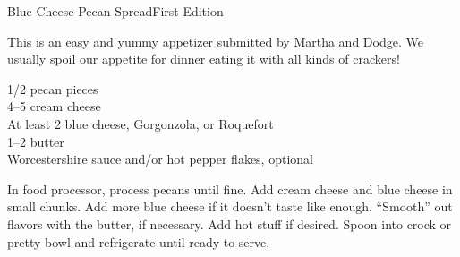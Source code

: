 \begin{entry}{Blue Cheese-Pecan Spread}{First Edition}

\begin{open}
  This is an easy and yummy appetizer submitted by Martha and Dodge.  We
  usually spoil our appetite for dinner eating it with all kinds of crackers!
\end{open}
\begin{ingredients}
  \SI{1/2}{\cup} pecan pieces\\
  \SIrange{4}{5}{\ounce} cream cheese\\
  At least \SI{2}{\tblspoon} blue cheese, Gorgonzola, or Roquefort\\
  \SIrange{1}{2}{\tblspoon} butter \\
  Worcestershire sauce and/or hot pepper flakes, optional
\end{ingredients}
In food processor, process pecans until fine. Add cream cheese and blue cheese
in small chunks. Add more blue cheese if it doesn't taste like enough.
``Smooth'' out flavors with the butter, if necessary. Add hot stuff if
desired.  Spoon into crock or pretty bowl and refrigerate until ready to
serve.
\end{entry}